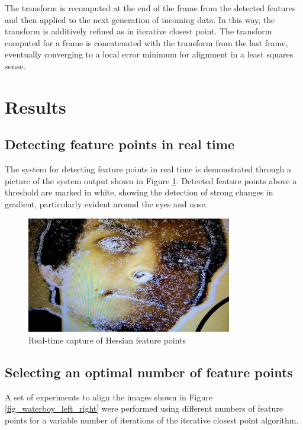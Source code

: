 \documentclass{article}
\begin{document}
The transform is recomputed at the end of the frame from the detected features and then applied to the next generation of incoming data. In this way, the transform is additively refined as in iterative closest point. The transform computed for a frame is concatenated with the transform from the last frame, eventually converging to a local error minimum for alignment in a least squares sense. 

\section{Results}

\subsection{Detecting feature points in real time}

The system for detecting feature points in real time is demonstrated through a picture of the system output shown in Figure \ref{fig_pic_features}. Detected feature points above a threshold are marked in white, showing the detection of strong changes in gradient, particularly evident around the eyes and nose.

\begin{figure}[h]
	\centering
	\includegraphics[width=0.8\textwidth]{figures/pictures/features}
	\caption{Real-time capture of Hessian feature points}
	\label{fig_pic_features}
\end{figure}

\subsection{Selecting an optimal number of feature points}

A set of experiments to align the images shown in Figure \ref{fig_waterboy_left_right} were performed using different numbers of feature points for a variable number of iterations of the iterative closest point algorithm.
\end{document}
